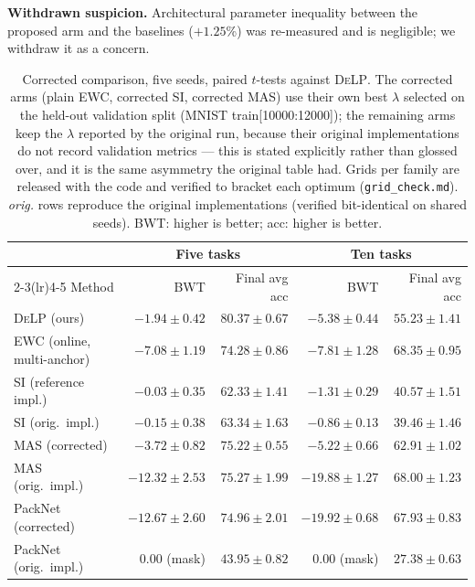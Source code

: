 \documentclass[conference]{IEEEtran}
\newcommand{\delp}{\textsc{DeLP}}
\begin{document}
\noindent\textbf{Withdrawn suspicion.} Architectural parameter inequality between the proposed
arm and the baselines ($+1.25$\%) was re-measured and is negligible; we withdraw it as a concern.

\begin{table}[t]
\centering
\caption{Corrected comparison, five seeds, paired $t$-tests against \delp{}. The corrected arms
(plain EWC, corrected SI, corrected MAS) use their own best $\lambda$ selected on the held-out
validation split (MNIST train[10000:12000]); the remaining arms keep the $\lambda$ reported by the
original run, because their original implementations do not record validation metrics --- this
is stated explicitly rather than glossed over, and it is the same asymmetry the original table
had. Grids per family are released with the code and verified to bracket each optimum
(\texttt{grid\_check.md}). \emph{orig.} rows reproduce the original implementations (verified
bit-identical on shared seeds). BWT: higher is better; acc: higher is better.}
\label{tab:main}
\small
\begin{tabular}{lrrrr}
\toprule
 & \multicolumn{2}{c}{Five tasks} & \multicolumn{2}{c}{Ten tasks} \\
\cmidrule(lr){2-3}\cmidrule(lr){4-5}
Method & BWT & Final avg acc & BWT & Final avg acc \\
\midrule
\delp{} (ours)                     & $\mathbf{-1.94 \pm 0.42}$ & $\mathbf{80.37 \pm 0.67}$ & $-5.38 \pm 0.44$ & $55.23 \pm 1.41$ \\
EWC (online, multi-anchor)         & $-7.08 \pm 1.19$ & $74.28 \pm 0.86$ & $-7.81 \pm 1.28$ & $\mathbf{68.35 \pm 0.95}$ \\
SI (reference impl.)               & $\mathbf{-0.03 \pm 0.35}$ & $62.33 \pm 1.41$ & $\mathbf{-1.31 \pm 0.29}$ & $40.57 \pm 1.51$ \\
SI (orig.\ impl.)                  & $-0.15 \pm 0.38$ & $63.34 \pm 1.63$ & $-0.86 \pm 0.13$ & $39.46 \pm 1.46$ \\
MAS (corrected)                    & $-3.72 \pm 0.82$ & $75.22 \pm 0.55$ & $-5.22 \pm 0.66$ & $62.91 \pm 1.02$ \\
MAS (orig.\ impl.)                 & $-12.32 \pm 2.53$ & $75.27 \pm 1.99$ & $-19.88 \pm 1.27$ & $68.00 \pm 1.23$ \\
PackNet (corrected)                & $-12.67 \pm 2.60$ & $74.96 \pm 2.01$ & $-19.92 \pm 0.68$ & $67.93 \pm 0.83$ \\
PackNet (orig.\ impl.)             & $0.00$ (mask) & $43.95 \pm 0.82$ & $0.00$ (mask) & $27.38 \pm 0.63$ \\
\bottomrule
\end{tabular}
\end{table}
\end{document}
